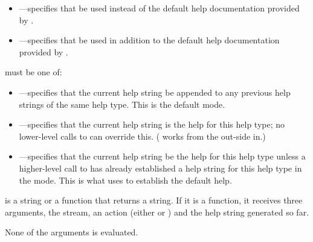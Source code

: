 \begin{itemize}
\item {}---specifies that  be used instead of
the default help documentation provided by .

\item {}---specifies that  be used in addition to
the default help documentation provided by .
\end{itemize}

 must be one of:

\begin{itemize}
\item {}---specifies that the current help string be appended to any
previous help strings of the same help type. This is the default mode.

\item {}---specifies that the current help string is the help for
this help type; no lower-level calls to  can override this.
( works from the out-side in.)

\item {}---specifies that the current help string
be the help for this help type unless a higher-level call to
 has already established a help string for this help type
in the  mode. This is what  uses to establish the
default help.
\end{itemize}

 is a string or a function that returns a string.  If it is a
function, it receives three arguments, the stream, an action (either 
or ) and the help string generated so far.

None of the arguments is evaluated. 
